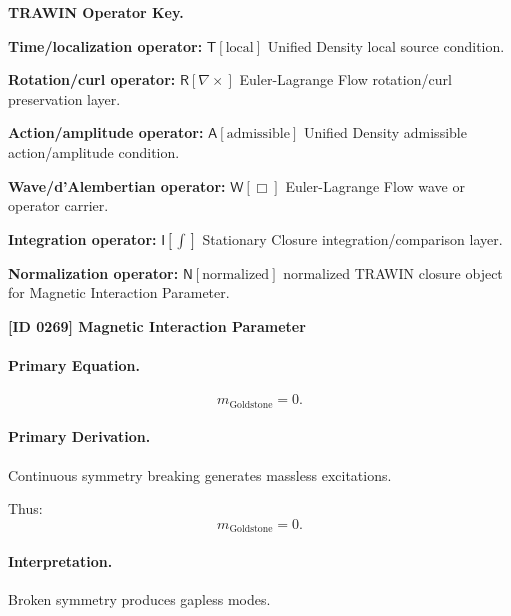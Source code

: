 \par\vspace{0.45\baselineskip}
\noindent\begin{minipage}[t]{\linewidth}
\begingroup
\small
\raggedright
\textbf{TRAWIN Operator Key.}\par
\noindent\textbf{Time/localization operator:} $\mathsf{T}\!\left[\mathrm{local}\right]$ Unified Density local source condition.\par
\noindent\textbf{Rotation/curl operator:} $\mathsf{R}\!\left[\nabla\times\right]$ Euler-Lagrange Flow rotation/curl preservation layer.\par
\noindent\textbf{Action/amplitude operator:} $\mathsf{A}\!\left[\mathrm{admissible}\right]$ Unified Density admissible action/amplitude condition.\par
\noindent\textbf{Wave/d'Alembertian operator:} $\mathsf{W}\!\left[\Box\right]$ Euler-Lagrange Flow wave or operator carrier.\par
\noindent\textbf{Integration operator:} $\mathsf{I}\!\left[\int\right]$ Stationary Closure integration/comparison layer.\par
\noindent\textbf{Normalization operator:} $\mathsf{N}\!\left[\mathrm{normalized}\right]$ normalized TRAWIN closure object for Magnetic Interaction Parameter.\par
\endgroup
\end{minipage}

\clearpage
\noindent\textbf{[ID 0269] Magnetic Interaction Parameter}\par
\vspace{0.35em}
\paragraph{Primary Equation.}
\begin{equation}
m_{\mathrm{Goldstone}} = 0.
\end{equation}

\paragraph{Primary Derivation.}
Continuous symmetry breaking generates massless excitations.

Thus:
\begin{equation}
\boxed{
m_{\mathrm{Goldstone}} = 0.
}
\end{equation}

\paragraph{Interpretation.}
Broken symmetry produces gapless modes.

